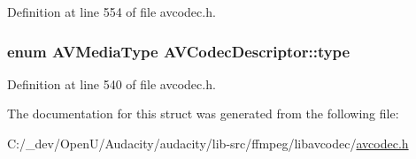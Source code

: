Definition at line 554 of file avcodec.\+h.

\subsubsection[{\texorpdfstring{type}{type}}]{\setlength{\rightskip}{0pt plus 5cm}enum {\bf A\+V\+Media\+Type} A\+V\+Codec\+Descriptor\+::type}\hypertarget{struct_a_v_codec_descriptor_ad628ddb3416cafa38c9d4f3c1f61ad50}{}\label{struct_a_v_codec_descriptor_ad628ddb3416cafa38c9d4f3c1f61ad50}


Definition at line 540 of file avcodec.\+h.



The documentation for this struct was generated from the following file\+:\begin{DoxyCompactItemize}
\item 
C\+:/\+\_\+dev/\+Open\+U/\+Audacity/audacity/lib-\/src/ffmpeg/libavcodec/\hyperlink{avcodec_8h}{avcodec.\+h}\end{DoxyCompactItemize}
